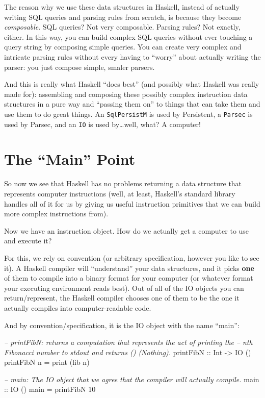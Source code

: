 \documentclass[]{article}
\newenvironment{Shaded}{}{}
\newcommand{\DataTypeTok}[1]{\textcolor[rgb]{0.56,0.13,0.00}{{#1}}}
\newcommand{\DecValTok}[1]{\textcolor[rgb]{0.25,0.63,0.44}{{#1}}}
\newcommand{\CommentTok}[1]{\textcolor[rgb]{0.38,0.63,0.69}{\textit{{#1}}}}
\newcommand{\OtherTok}[1]{\textcolor[rgb]{0.00,0.44,0.13}{{#1}}}
\newcommand{\FunctionTok}[1]{\textcolor[rgb]{0.02,0.16,0.49}{{#1}}}
\newcommand{\NormalTok}[1]{{#1}}
\begin{document}
The reason why we use these data structures in Haskell, instead of actually writing SQL queries and
parsing rules from scratch, is because they become \emph{composable}. SQL queries? Not very
composable. Parsing rules? Not exactly, either. In this way, you can build complex SQL queries
without ever touching a query string by composing simple queries. You can create very complex and
intricate parsing rules without every having to ``worry'' about actually writing the parser: you
just compose simple, smaler parsers.

And this is really what Haskell ``does best'' (and possibly what Haskell was really made for):
assembling and composing these possibly complex instruction data structures in a pure way and
``passing them on'' to things that can take them and use them to do great things. An
\texttt{SqlPersistM} is used by Persistent, a \texttt{Parsec} is used by Parsec, and an \texttt{IO}
is used by\ldots{}well, what? A computer!

\section{\texorpdfstring{The ``Main'' Point}{The Main Point}}\label{the-main-point}

So now we see that Haskell has no problems returning a data structure that represents computer
instructions (well, at least, Haskell's standard library handles all of it for us by giving us
useful instruction primitives that we can build more complex instructions from).

Now we have an instruction object. How do we actually get a computer to use and execute it?

For this, we rely on convention (or arbitrary specification, however you like to see it). A Haskell
compiler will ``understand'' your data structures, and it picks \textbf{one} of them to compile into
a binary format for your computer (or whatever format your executing environment reads best). Out of
all of the IO objects you can return/represent, the Haskell compiler chooses one of them to be the
one it actually compiles into computer-readable code.

And by convention/specification, it is the IO object with the name ``main'':

\begin{Shaded}
\begin{Highlighting}[]
\CommentTok{--  printFibN: returns a computation that represents the act of printing the}
\CommentTok{--      nth Fibonacci number to stdout and returns () (Nothing).}
\OtherTok{printFibN ::} \DataTypeTok{Int} \OtherTok{->} \DataTypeTok{IO} \NormalTok{()}
\NormalTok{printFibN n }\FunctionTok{=} \NormalTok{print (fib n)}

\CommentTok{--  main: The IO object that we agree that the compiler will actually compile.}
\OtherTok{main ::} \DataTypeTok{IO} \NormalTok{()}
\NormalTok{main }\FunctionTok{=} \NormalTok{printFibN }\DecValTok{10}
\end{Highlighting}
\end{Shaded}
\end{document}
